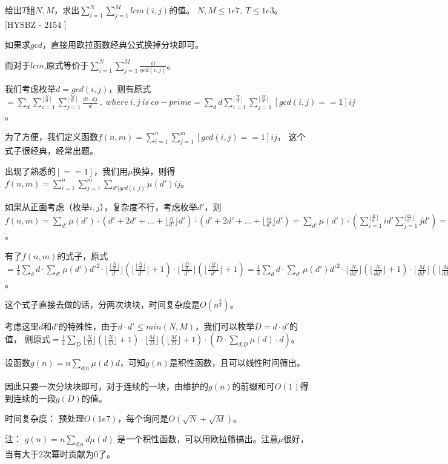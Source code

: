 

\vbox{}

\begin{example}
给出$T$组$N,M$，求出$\sum_{i=1}^{N}\sum_{j=1}^Mlcm(i,j)$的值。     $N,M\le 1e7,\ T\le 1e3$。     [HYSBZ - 2154 ]
\end{example}

\begin{solution}
\label{exa:lcm}
如果求$gcd$，直接用欧拉函数经典公式换掉分块即可。

而对于$lcm$,原式等价于$\sum_{i=1}^{N}\sum_{j=1}^M\frac{ij}{gcd(i,j)}$。 

我们考虑枚举$d=gcd(i,j)$，则有原式$=\sum_{d}\sum_{i=1}^{\lfloor\frac{N}{d}\rfloor}\sum_{j=1}^{\lfloor\frac{M}{d}\rfloor}\frac{di\cdot dj}{d}\ ,\ where \ i,j \ is \ co-prime=\sum_{d}d \sum_{i=1}^{\lfloor\frac{N}{d}\rfloor}\sum_{j=1}^{\lfloor\frac{M}{d}\rfloor}[gcd(i,j)==1]ij$。 

为了方便，我们定义函数$f(n,m)=\sum_{i=1}^n\sum_{j=1}^m[gcd(i,j)==1]ij$， 这个式子很经典，经常出题。  

出现了熟悉的$[==1]$，我们用$\mu$换掉，则得$f(n,m)=\sum_{i=1}^{n}\sum_{j=1}^{m}\sum_{d'|gcd(i,j)}\mu(d')ij$。 

如果从正面考虑（枚举$i,j$），复杂度不行，考虑枚举$d'$，则$f(n,m)=\sum_{d'}\mu(d')\cdot (d'+2d'+...+\lfloor \frac{n}{d'}\rfloor d')\cdot (d'+2d'+...+\lfloor \frac{m}{d'}\rfloor d')=\sum_{d'} \mu(d')\cdot (\sum_{i=1}^{\lfloor \frac{n}{d'}\rfloor}id'\sum_{j=1}^{\lfloor \frac{m}{d'}\rfloor}jd') =\frac{1}{4}\sum_{d'}\mu(d')d'^{2}\cdot \lfloor \frac{n}{d'}\rfloor(\lfloor \frac{n}{d'}\rfloor+1)\cdot \lfloor \frac{m}{d'}\rfloor(\lfloor \frac{m}{d'}\rfloor+1)$。 

有了$f(n,m)$的式子，原式$=\frac{1}{4}\sum_dd\cdot \sum_{d'}\mu(d')d'^{2}\cdot \lfloor \frac{\lfloor\frac{N}{d} \rfloor }{d'}\rfloor(\lfloor \frac{\lfloor\frac{N}{d} \rfloor }{d'}\rfloor+1)\cdot \lfloor \frac{\lfloor\frac{M}{d} \rfloor }{d'}\rfloor(\lfloor \frac{\lfloor\frac{M}{d} \rfloor }{d'}\rfloor+1) =\frac{1}{4}\sum_dd\cdot \sum_{d'}\mu(d')d'^{2}\cdot \lfloor \frac{N}{dd'}\rfloor(\lfloor \frac{N }{dd'}\rfloor+1)\cdot \lfloor \frac{M}{dd'}\rfloor(\lfloor \frac{M }{dd'}\rfloor+1)$。

这个式子直接去做的话，分两次块块，时间复杂度是$O(n^{\frac{3}{4}})$。 

考虑这里$d$和$d'$的特殊性，由于$d\cdot d'\le min(N,M)$，我们可以枚举$D=d\cdot d'$的值，
则原式$=\frac{1}{4}\sum_{D}\lfloor \frac{N}{D}\rfloor(\lfloor \frac{N }{D}\rfloor+1)\cdot \lfloor \frac{M}{D}\rfloor(\lfloor \frac{M }{D}\rfloor+1)\cdot (D\cdot \sum_{d|D}\mu(d)\cdot d)$。  

设函数$g(n)=n\sum_{d|n}\mu(d)d$，可知$g(n)$是积性函数，且可以线性时间筛出。

因此只要一次分块块即可，对于连续的一块，由维护的$g(n)$的前缀和可$O(1)$得到连续的一段$g(D)$的值。

{\heiti 时间复杂度：    预处理$O(1e7)$，每个询问是$O(\sqrt{N}+\sqrt{M})$。

注：  $g(n) = n\sum_{d|n}{d\mu(d)}$   是一个积性函数，可以用欧拉筛搞出。注意$\mu$很好，当有大于2次幂时贡献为0了。}
\end{solution}

